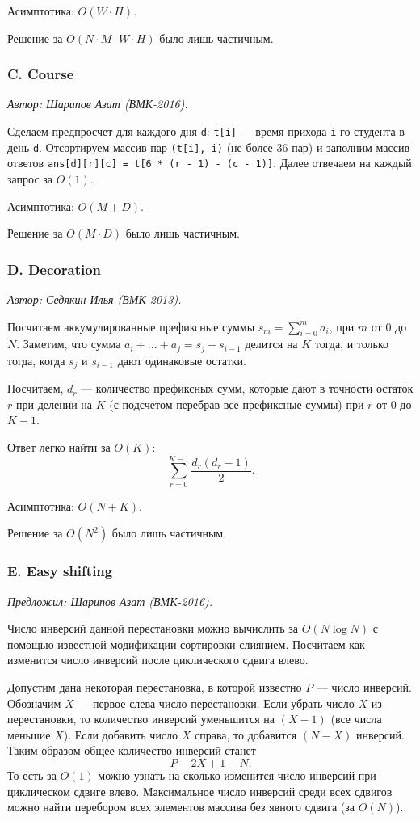 \documentclass[10pt, a4paper]{article}
\newcommand{\problemauthor}[1]{
\begin{flushright}
\textit{Автор: #1}
\end{flushright}
}
\newcommand{\problemofferer}[1]{
\begin{flushright}
\textit{Предложил: #1}
\end{flushright}
}
\begin{document}
Асимптотика: $O(W \cdot H)$. 

Решение за $O(N \cdot M \cdot W \cdot H)$ было лишь частичным.

\subsubsection*{C. Course}


\problemauthor{Шарипов Азат (ВМК-2016).}

Сделаем предпросчет для каждого дня {\tt d}: {\tt t[i]} --- время прихода {\tt i}-го студента в день {\tt d}. Отсортируем массив пар {\tt (t[i], i)} (не более 36 пар) и заполним массив ответов {\tt ans[d][r][c] = t[6 * (r - 1) - (c - 1)]}. Далее отвечаем на каждый запрос за $O(1)$.

Асимптотика: $O(M + D)$. 

Решение за $O(M \cdot D)$ было лишь частичным.

\subsubsection*{D. Decoration}


\problemauthor{Седякин Илья (ВМК-2013).}

Посчитаем аккумулированные префиксные суммы $s_m = \sum_{i=0}^m a_i$, при $m$ от 0 до $N$. Заметим, что сумма $a_{i} + ... + a_{j} = s_j - s_{i-1}$ делится на $K$ тогда, и только тогда, когда $s_j$ и $s_{i-1}$ дают одинаковые остатки. 

Посчитаем, $d_r$ --- количество префиксных сумм, которые дают в точности остаток $r$ при делении на $K$ (с подсчетом перебрав все префиксные суммы) при $r$ от 0 до $K-1$. 

Ответ легко найти за $O(K)$: $$\sum\limits_{r = 0}^{K-1} \frac{d_r(d_r - 1)}{2}.$$

Асимптотика: $O(N + K)$. 

Решение за $O(N^2)$ было лишь частичным.

\subsubsection*{E. Easy shifting}


\problemofferer{Шарипов Азат (ВМК-2016).}

Число инверсий данной перестановки можно вычислить за $O(N \log N)$ с помощью известной модификации сортировки слиянием. Посчитаем как изменится число инверсий после циклического сдвига влево.

Допустим дана некоторая перестановка, в которой известно $P$ --- число инверсий. Обозначим $X$ --- первое слева число перестановки. Если убрать число $X$ из перестановки, то количество инверсий уменьшится на $(X - 1)$ (все числа меньшие $X$). Если добавить число $X$ справа, то добавится $(N - X)$ инверсий. Таким образом общее количество инверсий станет $$P - 2 X + 1 - N.$$ 
То есть за $O(1)$ можно узнать на сколько изменится число инверсий при циклическом сдвиге влево. Максимальное число инверсий среди всех сдвигов можно найти перебором всех элементов массива без явного сдвига (за $O(N)$).
\end{document}
